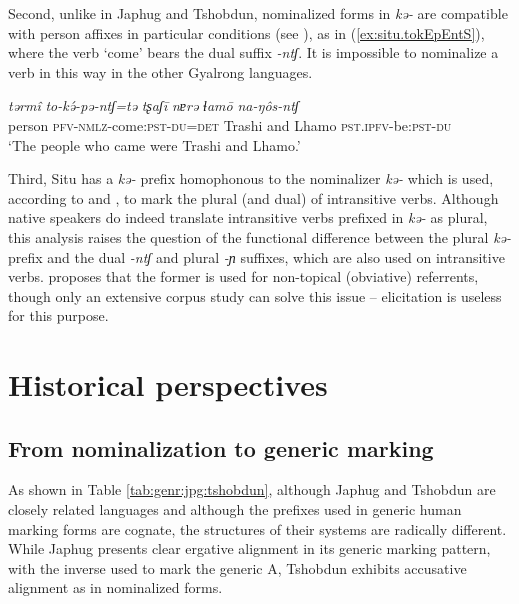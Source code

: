 \documentclass[oneside,a4paper,11pt]{article}
\newcommand{\ipa}[1]{\textit{\phon\mbox{#1}}} %
\newcommand{\refb}[1]{(\ref{#1})}
\begin{document}
Second, unlike in Japhug and Tshobdun, nominalized forms in \ipa{kə-} are compatible with person affixes in particular conditions (see \citealt[11-12]{jacksonlin07}), as in \refb{ex:situ.tokEpEntS}, where the verb `come' bears the dual suffix \ipa{-ntʃ}. It is impossible to nominalize a verb in this way in the other Gyalrong languages.

 \begin{exe}
\ex \label{ex:situ.tokEpEntS}
\gll
\ipa{tərmî}  	\ipa{to-kə́-pə-ntʃ=tə}  	\ipa{tʂaʃī}  	\ipa{nɐrə}  	\ipa{ɬamō}  	\ipa{na-ŋôs-ntʃ}  	\\
person \textsc{pfv-nmlz}-come:\textsc{pst}-\textsc{du=det} Trashi and Lhamo \textsc{pst.ipfv}-be:\textsc{pst}-\textsc{du} \\
\glt `The people who came were Trashi and Lhamo.'
  \end{exe}

Third, Situ has a   \ipa{kə-} prefix homophonous to the nominalizer \ipa{kə-} which is used, according to \citealt[218]{linxr93jiarong} and \citet[163]{lin09phd}, to mark the plural (and dual) of intransitive verbs. Although native speakers do indeed translate intransitive verbs prefixed in \ipa{kə-} as plural, this analysis raises the question of the functional difference between the plural \ipa{kə-} prefix and the dual \ipa{-ntʃ}  and plural \ipa{-ɲ} suffixes, which are also used on intransitive verbs. \citet[101-102]{jacques12agreement} proposes that the former is used for non-topical (obviative) referrents, though only an extensive corpus study can solve this issue -- elicitation is useless for this purpose.

\section{Historical perspectives}
\subsection{From nominalization to generic marking} \label{sec:nmlz2genr}
As shown in Table \ref{tab:genr:jpg:tshobdun}, although Japhug and Tshobdun are closely related languages and although the prefixes used in generic human marking forms are cognate, the structures of their systems are radically different. While Japhug presents clear ergative alignment in its generic marking pattern, with the inverse used to mark the generic A, Tshobdun exhibits accusative alignment as in nominalized forms.
\end{document}
